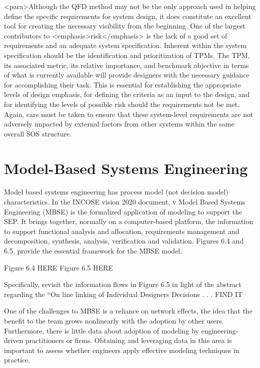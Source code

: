 <para>Although the QFD method may not be the only approach used in helping define the specific requirements for system design, it does constitute an excellent tool for creating the necessary visibility from the beginning. One of the largest contributors to <emphasis>risk</emphasis> is the lack of a good set of requirements and an adequate system specification. Inherent within the system specification should be the identification and prioritization of TPMs. The TPM, its associated metric, its relative importance, and benchmark objective in terms of what is currently available will provide designers with the necessary guidance for accomplishing their task. This is essential for establishing the appropriate levels of design emphasis, for defining the criteria as an input to the design, and for identifying the levels of possible risk should the requirements not be met. Again, care must be taken to ensure that these system-level requirements are not adversely impacted by external factors from other systems within the same overall SOS structure.


\section{Model-Based Systems Engineering}

Model based systems engineering has process model (not decision model) characteristics. In the INCOSE vision 2020 document, v Model Based Systems Engineering (MBSE) is the formalized application of modeling to support the SEP. It brings together, normally on a computer-based platform, the information to support functional analysis and allocation, requirements management and decomposition, synthesis, analysis, verification and validation. Figures 6.4 and 6.5. provide the essential framework for the MBSE model.

Figure 6.4 HERE
Figure 6.5 HERE
	
Specifically, revisit the information flows in Figure 6.5 in light of the abstract regarding the “On line linking of Individual Designers Decisions . . . FIND IT

One of the challenges to MBSE is a reliance on network effects, the idea that the benefit to the team grows nonlinearly with the adoption by other users. Furthermore, there is little data about adoption of modeling by engineering-driven practitioners or firms. Obtaining and leveraging data in this area is important to assess whether engineers apply effective modeling techniques in practice.

